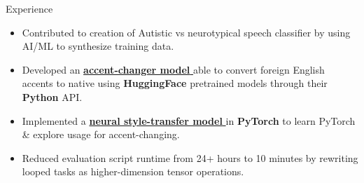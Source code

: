 \documentclass{resume} %
\begin{document}

\begin{workSection}{Experience}
	
	\experienceItem[
	company=Texas Instruments,
	location=Dallas{,} TX,
	position=Upcoming Information Technology Intern,
	duration= May - August 2024,
	]
	
	\experienceItem[
	company=UTEP,
	location=El Paso{,} TX,
	position=Undergraduate Research Assistant,
	duration=January 2024 - present,
	]
	\begin{itemize}
		\vspace{-0.5em}
		\itemsep -6pt {}
		\item Contributed to creation of Autistic vs neurotypical speech classifier by using AI/ML to synthesize training data.
		 \item Developed an \href{https://github.com/AshkanArabim/accent-change-paper-implementation}{\textbf{accent-changer model} \faExternalLink} able to convert foreign English accents to native using \textbf{HuggingFace} pretrained models through their \textbf{Python} API.
		\item Implemented a \href{https://github.com/AshkanArabim/neural-style-transfer}{\textbf{neural style-transfer model} \faExternalLink} in \textbf{PyTorch} to learn PyTorch \& explore usage for accent-changing.
       \item Reduced evaluation script runtime from 24+ hours to 10 minutes by rewriting looped tasks as higher-dimension tensor operations.
	\end{itemize}
	
	

\end{workSection}
\end{document}
